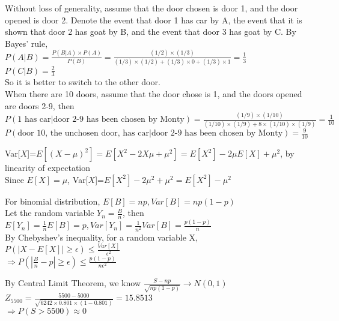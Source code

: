 \documentclass[12pt]{article}
\newenvironment{problem}[2][Problem]{\begin{trivlist}
\item[\hskip \labelsep {\bfseries #1}\hskip \labelsep {\bfseries #2.}]}{\end{trivlist}}
\begin{document}
\begin{problem}{1(3.12)}\hfill\linebreak
Without loss of generality, assume that the door chosen is door 1, and the door opened is door 2. Denote the event that door 1 has car by A, the event that it is shown that door 2 has goat by B, and the event that door 3 has goat by C. By Bayes' rule,\\
$P(A|B)=\frac{P(B|A)\times P(A)}{P(B)}=\frac{(1/2)\times (1/3)}{(1/3)\times(1/2)+(1/3)\times 0+ (1/3)\times 1}=\frac{1}{3}$\\
$P(C|B)=\frac{2}{3}$\\
So it is better to switch to the other door.\\
When there are 10 doors, assume that the door chose is 1, and the doors opened are doors 2-9, then\\
$P(\text{1 has car} | \text{door 2-9 has been chosen by Monty})=\frac{(1/9) \times (1/10)}{(1/10)\times (1/9)+8\times (1/10)\times (1/9)}=\frac{1}{10}$\\
$P(\text{door 10, the unchosen door, has car}|\text{door 2-9 has been chosen by Monty})=\frac{9}{10}$
\end{problem}

\begin{problem}{1(3.16)}\hfill\linebreak
Var[$X$]=$E[(X-\mu)^2]=E[X^2-2X\mu+\mu^2]=E[X^2]-2\mu E[X]+\mu^2$, by linearity of expectation\\
Since $E[X]=\mu$, Var[$X$]=$E[X^2]-2\mu^2+\mu^2=E[X^2]-\mu^2$
\end{problem}

\begin{problem}{1(3.33)}\hfill\linebreak
For binomial distribution, $E[B]=np, Var[B]=np(1-p)$\\
Let the random variable $Y_n=\frac{B}{n}$, then $E[Y_n]=\frac{1}{n}E[B]=p, Var[Y_n]=\frac{1}{n^2}Var[B]=\frac{p(1-p)}{n}$\\
By Chebyshev's inequality, for a random variable X, $P(|X-E[X]|\geq \epsilon)\leq \frac{Var[X]}{\epsilon^2}$\\
$\Rightarrow P(|\frac{B}{n}-p|\geq \epsilon)\leq \frac{p(1-p)}{n\epsilon^2}$
\end{problem}

\begin{problem}{1(3.36)}\hfill\linebreak
By Central Limit Theorem, we know $\frac{S-np}{\sqrt{np(1-p)}}\rightarrow N(0,1)$\\
$Z_{5500}=\frac{5500-5000}{\sqrt{6242\times 0.801\times (1-0.801)}}=15.8513$\\
$\Rightarrow P(S>5500)\approx 0$
\end{problem}
\end{document}
